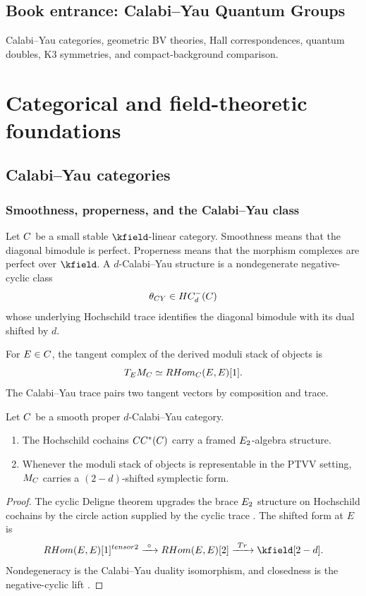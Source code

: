 \cleardoublepage
{}
{}
\chapter*{Book entrance: Calabi--Yau Quantum Groups}
\begin{summarybox}
Calabi--Yau categories, geometric BV theories, Hall correspondences, quantum doubles, K3 symmetries, and compact-background comparison.
\end{summarybox}
\part{Categorical and field-theoretic foundations}

\chapter{Calabi--Yau categories}
\section{Smoothness, properness, and the Calabi--Yau class}
Let $C$ be a small stable $\kfield$-linear category. Smoothness means that the diagonal bimodule is perfect. Properness means that the morphism complexes are perfect over $\kfield$. A $d$-Calabi--Yau structure is a nondegenerate negative-cyclic class
\[
 \theta_{CY}\in HC^-_d(C)
\]
whose underlying Hochschild trace identifies the diagonal bimodule with its dual shifted by $d$.

For $E\in C$, the tangent complex of the derived moduli stack of objects is
\[
 T_EM_{C}\simeq RHom_{C}(E,E)[1].
\]
The Calabi--Yau trace pairs two tangent vectors by composition and trace.

\begin{theorem}
Let $C$ be a smooth proper $d$-Calabi--Yau category.
\begin{enumerate}
\item The Hochschild cochains $CC^*(C)$ carry a framed $E_2$-algebra structure.
\item Whenever the moduli stack of objects is representable in the PTVV setting, $M_{C}$ carries a $(2-d)$-shifted symplectic form.
\end{enumerate}
\end{theorem}
\begin{proof}
The cyclic Deligne theorem upgrades the brace $E_2$ structure on Hochschild cochains by the circle action supplied by the cyclic trace \cite{BravRozenblyum}. The shifted form at $E$ is
\[
 \RHom(E,E)[1]^{\tensor2}
 \xrightarrow{\ \circ\ }
 \RHom(E,E)[2]
 \xrightarrow{\ \Tr\ }
 \kfield[2-d].
\]
Nondegeneracy is the Calabi--Yau duality isomorphism, and closedness is the negative-cyclic lift \cite{PTVV,BravDyckerhoff}.
\end{proof}

